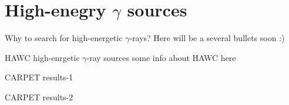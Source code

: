 
\begin{frame}
\titlepage
\end{frame}

\section{High-enegry $\gamma$ sources}

\begin{frame}{Why to search for high-energetic $\gamma$-rays?}
 Here will be a several bullets soon :)
\end{frame}

\begin{frame}{HAWC high-enrgetic $\gamma$-ray sources}
 some info about HAWC here
\end{frame}

\begin{frame}{CARPET results-1}
 
\end{frame}

\begin{frame}{CARPET results-2}
 
\end{frame}

